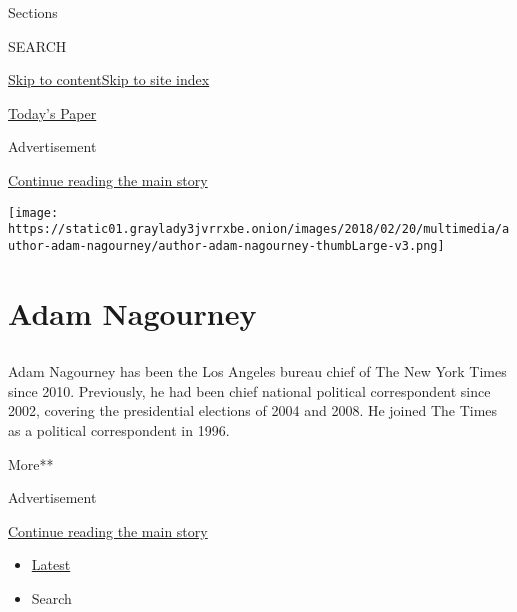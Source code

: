 Sections

SEARCH

\protect\hyperlink{site-content}{Skip to
content}\protect\hyperlink{site-index}{Skip to site index}

\href{https://myaccount.nytimes3xbfgragh.onion/auth/login?response_type=cookie\&client_id=vi}{}

\href{https://www.nytimes3xbfgragh.onion/section/todayspaper}{Today's
Paper}

Advertisement

\protect\hyperlink{after-top}{Continue reading the main story}

\texttt{[image: https://static01.graylady3jvrrxbe.onion/images/2018/02/20/multimedia/author-adam-nagourney/author-adam-nagourney-thumbLarge-v3.png]}

\hypertarget{adam-nagourney}{%
\section{Adam Nagourney}\label{adam-nagourney}}

\subsection{}

Adam Nagourney has been the Los Angeles bureau chief of The New York
Times since 2010. Previously, he had been chief national political
correspondent since 2002, covering the presidential elections of 2004
and 2008. He joined The Times as a political correspondent in 1996.

More**

Advertisement

\protect\hyperlink{after-mid1}{Continue reading the main story}

\begin{itemize}
\tightlist
\item
  \protect\hyperlink{stream-panel}{Latest}
\item
  Search
\end{itemize}

